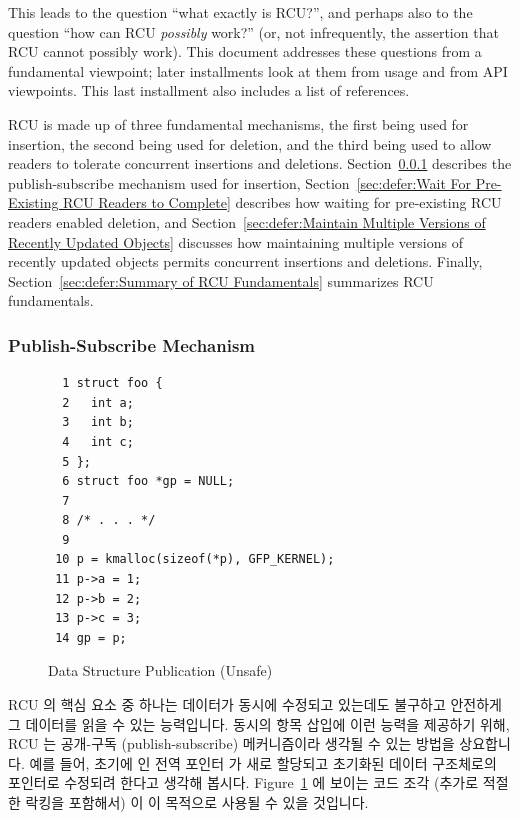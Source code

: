 This leads to the question ``what exactly is RCU?'', and perhaps also
to the question ``how can RCU \emph{possibly} work?'' (or, not
infrequently, the assertion that RCU cannot possibly work).
This document addresses these questions from a fundamental viewpoint;
later installments look at them from usage and from API viewpoints.
This last installment also includes a list of references.

RCU is made up of three fundamental mechanisms, the first being
used for insertion, the second being used for deletion, and the third
being used to allow readers to tolerate concurrent insertions and deletions.
Section~\ref{sec:defer:Publish-Subscribe Mechanism}
describes the publish-subscribe mechanism used for insertion,
Section~\ref{sec:defer:Wait For Pre-Existing RCU Readers to Complete}
describes how waiting for pre-existing RCU readers enabled deletion,
and
Section~\ref{sec:defer:Maintain Multiple Versions of Recently Updated Objects}
discusses how maintaining multiple versions of recently updated objects
permits concurrent insertions and deletions.
Finally,
Section~\ref{sec:defer:Summary of RCU Fundamentals}
summarizes RCU fundamentals.
\fi

\subsubsection{Publish-Subscribe Mechanism}
\label{sec:defer:Publish-Subscribe Mechanism}

\begin{figure}[tbp]
{ \scriptsize
\begin{verbatim}
  1 struct foo {
  2   int a;
  3   int b;
  4   int c;
  5 };
  6 struct foo *gp = NULL;
  7
  8 /* . . . */
  9
 10 p = kmalloc(sizeof(*p), GFP_KERNEL);
 11 p->a = 1;
 12 p->b = 2;
 13 p->c = 3;
 14 gp = p;
\end{verbatim}
}
\caption{Data Structure Publication (Unsafe)}
\label{fig:defer:Data Structure Publication (Unsafe)}
\end{figure}

RCU 의 핵심 요소 중 하나는 데이터가 동시에 수정되고 있는데도 불구하고 안전하게
그 데이터를 읽을 수 있는 능력입니다.
동시의 항목 삽입에 이런 능력을 제공하기 위해, RCU 는 공개-구독
(publish-subscribe) 메커니즘이라 생각될 수 있는 방법을 상요합니다.
예를 들어, 초기에  인 전역 포인터  가 새로 할당되고 초기화된
데이터 구조체로의 포인터로 수정되려 한다고 생각해 봅시다.
Figure~\ref{fig:defer:Data Structure Publication (Unsafe)} 에 보이는 코드 조각
(추가로 적절한 락킹을 포함해서) 이 이 목적으로 사용될 수 있을 것입니다.
\iffalse

